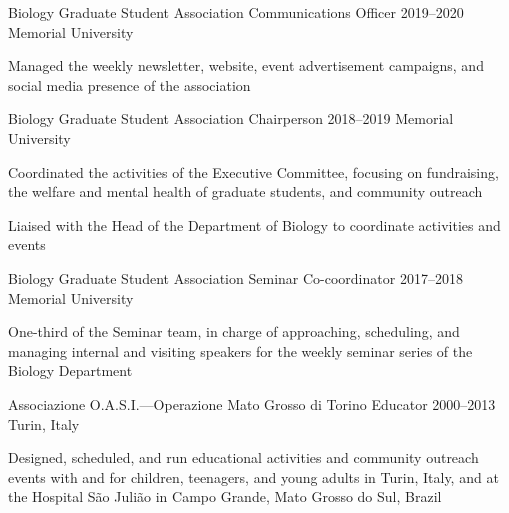\begin{cventries}
  \cventry
    {Biology Graduate Student Association} %
    {Communications Officer} %
    {2019--2020} %
    {Memorial University} %
    {
      \begin{cvitems} %
        \item {Managed the weekly newsletter, website, event advertisement campaigns, and social media presence of the association}
      \end{cvitems}
    }

  \cventry
    {Biology Graduate Student Association} %
    {Chairperson} %
    {2018--2019} %
    {Memorial University} %
    {
      \begin{cvitems} %
        \item {Coordinated the activities of the Executive Committee, focusing on fundraising, the welfare and mental health of graduate students, and community outreach}
        \item {Liaised with the Head of the Department of Biology to coordinate activities and events}
      \end{cvitems}
    }

  \cventry
    {Biology Graduate Student Association} %
    {Seminar Co-coordinator} %
    {2017--2018} %
    {Memorial University} %
    {
      \begin{cvitems} %
        \item {One-third of the Seminar team, in charge of approaching, scheduling, and managing internal and visiting speakers for the weekly seminar series of the Biology Department}
      \end{cvitems}
    }

  \cventry
    {Associazione O.A.S.I.---Operazione Mato Grosso di Torino} %
    {Educator} %
    {2000--2013} %
    {Turin, Italy} %
    {
      \begin{cvitems} %
        \item {Designed, scheduled, and run educational activities and community outreach events with and for children, teenagers, and young adults in Turin, Italy, and at the Hospital S{\~a}o Juli{\~a}o in Campo Grande, Mato Grosso do Sul, Brazil}
      \end{cvitems}
    }


\end{cventries}
